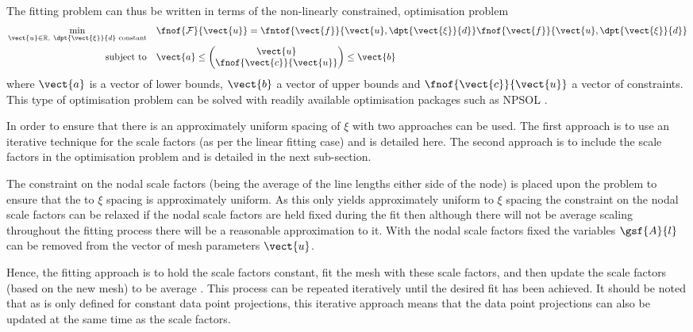 The fitting problem can thus be written in terms of the non-linearly
constrained, \nonlin optimisation problem
\begin{equation}
  \begin{split}
    \min_{\vect{u}\in\mathbb{R},~\dpt{\vect{\xi}}{d}\text{ constant}}\quad &
    \fnof{\mathcal{F}}{\vect{u}}=\fntof{\vect{f}}{\vect{u},
      \dpt{\vect{\xi}}{d}}\fnof{\vect{f}}{\vect{u},\dpt{\vect{\xi}}{d}} \\
    \text{subject to} \quad & \vect{a} \leq 
    \begin{pmatrix} 
      \vect{u} \\ 
      \fnof{\vect{c}}{\vect{u}}
    \end{pmatrix} \leq \vect{b}
  \end{split}
  \label{eqn:nloproblem}
\end{equation}
where $\vect{a}$ is a vector of lower bounds, $\vect{b}$ a vector of upper
bounds and $\fnof{\vect{c}}{\vect{u}}$ a vector of \nonlin constraints. This
type of optimisation problem can be solved with readily available \nonlin
optimisation packages such as NPSOL \cite{gill:1986}.

In order to ensure that there is an approximately uniform spacing of $\xi$
with \arclen two approaches can be used. The first approach is to use an
iterative technique for the scale factors (as per the linear fitting case) and
is detailed here. The second approach is to include the scale factors in the
optimisation problem and is detailed in the next sub-section.

The constraint on the nodal scale factors (being the average of the line
lengths either side of the node) is placed upon the problem to ensure that the
\arclen to $\xi$ spacing is approximately uniform. As this only yields
approximately uniform \arclen to $\xi$ spacing the constraint on the nodal
scale factors can be relaxed \ie if the nodal scale factors are held fixed
during the fit then although there will not be average \arclen scaling
throughout the fitting process there will be a reasonable approximation to it.
With the nodal scale factors fixed the variables $\gsf{A}{l}$ can be removed
from the vector of mesh parameters $\vect{u}$.

Hence, the \nonlin fitting approach is to hold the scale factors constant, fit
the mesh with these scale factors, and then update the scale factors (based on
the new mesh) to be average \arclen. This process can be repeated iteratively
until the desired fit has been achieved. It should be noted that as
 is only defined for constant data point projections,
this iterative approach means that the data point projections can also be
updated at the same time as the scale factors.

